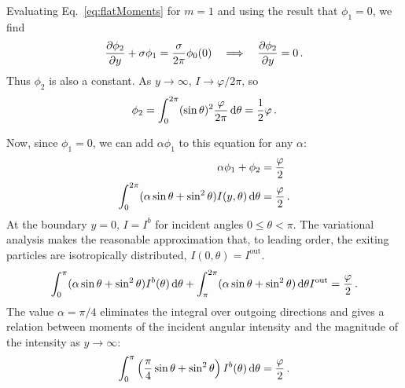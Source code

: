 Evaluating Eq.~\eqref{eq:flatMoments} for $m=1$ and using the result that
$\phi_{1}=0$, we find
\begin{equation*}
  \frac{\partial \phi_{2}}{\partial y}
  + \sigma \phi_{1}
  = \frac{\sigma}{2\pi} \phi_{0} (0)
  \quad \Longrightarrow \quad
  \frac{\partial \phi_{2}}{\partial y} = 0\,.
\end{equation*}
Thus $\phi_{2}$ is also a constant. As $y\to\infty$, $I\to\varphi/2\pi$, so
\begin{equation*}
  \phi_{2} = \int_{0}^{2\pi} (\sin\theta)^2 \frac{\varphi}{2\pi} \mathop{}\!\mathrm{d}\theta
  = \frac{1}{2} \varphi\,.
\end{equation*}

Now, since $\phi_1=0$, we can add $\alpha \phi_1$ to this equation for any
$\alpha$:
\begin{align*}
 \alpha\phi_1 + \phi_{2} &= \frac{\varphi}{2} \\
 \int_{0}^{2\pi} (\alpha \sin\theta + \sin^2\theta)
 I(y,\theta) \mathop{}\!\mathrm{d}\theta
 &= \frac{\varphi}{2}\,.
\end{align*}
At the boundary $y=0$, $I=I^b$ for incident angles $0 \le \theta < \pi$. The
variational analysis makes the reasonable approximation that, to leading order,
the exiting particles are isotropically distributed, $I(0,\theta)=I^\text{out}$.
\begin{equation*}
 \int_{0}^{\pi} (\alpha \sin\theta + \sin^2\theta)
 I^b(\theta) \mathop{}\!\mathrm{d}\theta
 + \int_{\pi}^{2\pi} (\alpha \sin\theta + \sin^2\theta)\mathop{}\!\mathrm{d}\theta I^\text{out}
 = \frac{\varphi}{2}\,.
\end{equation*}
The value $\alpha=\pi/4$ eliminates the integral over outgoing directions and
gives a relation between moments of the incident angular intensity and the
magnitude of the intensity as $y\to\infty$:
\begin{equation}\label{eq:varBoundary}
  \int_{0}^{\pi} \left( \frac{\pi}{4} \sin\theta + \sin^2\theta \right)
 I^b(\theta) \mathop{}\!\mathrm{d}\theta
 = \frac{\varphi}{2}\,.
\end{equation}

